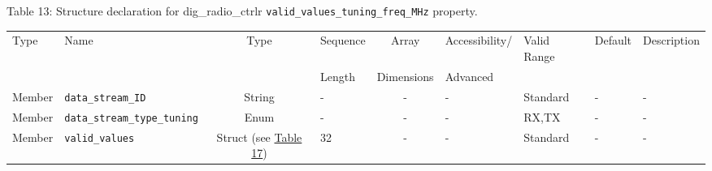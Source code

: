 \documentclass{article}
\def\comp{dig\_radio\_ctrlr}
\begin{document}
\begin{landscape}
	\noindent Table \hypertarget{tab13}{13}: Structure declaration for \comp{} \verb+valid_values_tuning_freq_MHz+ property.
	\begin{scriptsize}
		\noindent\begin{longtable}{|p{1.8cm}|p{3.6cm}|c|p{2cm}|c|p{2cm}|p{1.7cm}|p{0.8cm}|p{4.97cm}|}
			\hline
			\rowcolor{blue}
			Type         & Name                                & Type & Sequence & Array      & Accessibility/ & Valid Range  & Default & Description                                                                                                                                                                                                                       \\
			\rowcolor{blue}
			             &                                     &      & Length   & Dimensions & Advanced       &              &         &                                                                                                                                                                                                                             \\
			\hline
			Member       & \verb+data_stream_ID+               & String& -       & -          & -              & Standard     & -       & - \\
			\hline
			Member       & \verb+data_stream_type_tuning+      & Enum  & -       & -          & -              & RX,TX        & -       & - \\
			\hline
			Member       & \verb+valid_values+                 & Struct (see \hyperlink{tab17}{Table 17}) & 32      & -          & -              & Standard & -       & - \\
			\hline
		\end{longtable}
	\end{scriptsize}


\end{landscape}
\end{document}
